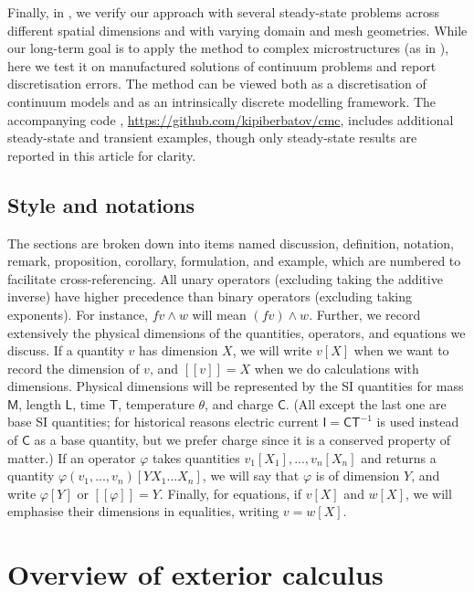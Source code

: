\documentclass{elsarticle}
\theoremstyle{definition}
\newcommand{\mass}{\mathsf{M}}
\newcommand{\length}{\mathsf{L}}
\renewcommand{\time}{\mathsf{T}}
\newcommand{\temperature}{\theta}
\newcommand{\charge}{\mathsf{C}}
\begin{document}
Finally, in , we verify our approach with several steady-state problems across different spatial dimensions and with varying domain and mesh geometries. While our long-term goal is to apply the method to complex microstructures (as in \cite[Section 4]{berbatov2022diffusion}), here we test it on manufactured solutions of continuum problems and report discretisation errors. The method can be viewed both as a discretisation of continuum models and as an intrinsically discrete modelling framework. The accompanying code \cite{berbatov2026cmc}, \url{https://github.com/kipiberbatov/cmc}, includes additional steady-state and transient examples, though only steady-state results are reported in this article for clarity.

\subsection{Style and notations}
\label{sec:introduction/style}

\noindent The sections are broken down into items named discussion, definition, notation, remark, proposition, corollary, formulation, and example, which are numbered to facilitate cross-referencing.
All unary operators (excluding taking the additive inverse) have higher precedence than binary operators (excluding taking exponents).
For instance, $f v \wedge w$ will mean $(f v) \wedge w$.
Further, we record extensively the physical dimensions of the quantities, operators, and equations we discuss.
If a quantity $v$ has dimension $X$, we will write $v [X]$ when we want to record the dimension of $v$, and $[[v]] = X$ when we do calculations with dimensions.
Physical dimensions will be represented by the SI quantities for mass $\mass$, length $\length$, time $\time$, temperature $\temperature$, and charge $\charge$.
(All except the last one are base SI quantities; for historical reasons electric current $\mathsf{I} = \charge \time^{-1}$ is used instead of $\charge$ as a base quantity, but we prefer charge since it is a conserved property of matter.)
If an operator $\varphi$ takes quantities $v_1 [X_1], ..., v_n[X_n]$ and returns a quantity $\varphi(v_1, ..., v_n) [Y X_1 ... X_n]$, we will say that $\varphi$ is of dimension $Y$, and write $\varphi [Y]$ or $[[\varphi]] = Y$.
Finally, for equations, if $v [X]$ and $w [X]$, we will emphasise their dimensions in equalities, writing $v = w [X]$.

\section{Overview of exterior calculus}
\label{sec:exterior_calculus}
\end{document}
